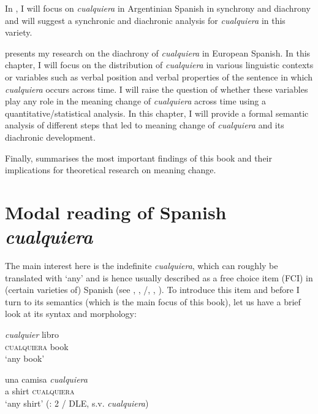   In , I will focus on \textit{cualquiera} in Argentinian Spanish in synchrony and diachrony and will suggest a synchronic and diachronic analysis for \textit{cualquiera} in this variety.

   presents my research on the diachrony of \textit{cualquiera} in European Spanish. In this chapter, I will focus on the distribution of \textit{cualquiera} in various linguistic contexts or variables such as verbal position and verbal properties of the sentence in which \textit{cualquiera} occurs across time. I will raise the question of whether these variables play any role in the meaning change of \textit{cualquiera} across time using a quantitative/statistical analysis. In this chapter, I will provide a formal semantic analysis of different steps that led to meaning change of \textit{cualquiera} and its diachronic development.

  Finally,  summarises the most important findings of this book and their implications for theoretical research on meaning change.

\section{Modal reading of Spanish \textit{cualquiera}}\label{sec:1.2}

The main interest here is the indefinite \textit{cualquiera}, which can roughly be translated with ‘any’ and is hence usually described as a free choice item (FCI) in (certain varieties of) Spanish (see \citealt{Brucart1999}, \citealt{Sanchezlopez1999}, \cite{Alonso-OvalleMenéndez-Benito2011}/\citeyear*{AlonsoMenendez2018}, \citealt{Rivero2011}, \citealt{Eberenz2000}). To introduce this item and before I turn to its semantics (which is the main focus of this book), let us have a brief look at its syntax and morphology:


\ea \label{ex:key:1}
\ea \label{ex:key:1a}
    \gll \textit{cualquier} libro\\  
    \textsc{cualquiera} book\\ %
    \glt ‘any book’  

\ex \label{ex:key:1b}
    \gll una camisa \textit{cualquiera}\\
     a shirt \textsc{cualquiera}\\
    \glt ‘any shirt’ (\citealt{AloniEtAl2011}: 2 / DLE, s.v. \textit{cualquiera})
\z
\z



